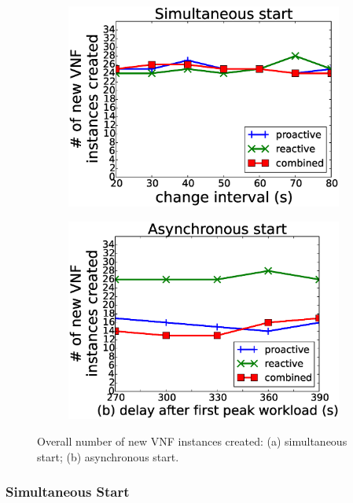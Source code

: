 \begin{figure}[!h]
  \begin{subfigure}[t]{0.49\linewidth}
   \centering
   \includegraphics[width=\columnwidth]{chap-scalims/figure/nf-creation1.eps}
  \end{subfigure}
  \begin{subfigure}[t]{0.49\linewidth}
     \centering
     \includegraphics[width=\columnwidth]{chap-scalims/figure/nf-creation2.eps}
    \end{subfigure}
        \caption{Overall number of new VNF instances created: (a) simultaneous start; (b) asynchronous start.}
        \label{fig:nf-creation}
\end{figure}

\subsubsection{Simultaneous Start}

